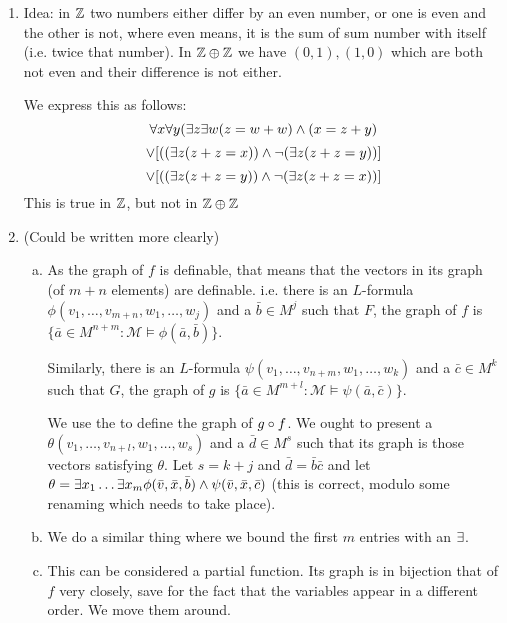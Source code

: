 \begin{enumerate}
\begin{enumerate}
	\item
	
	\end{enumerate}

\item Idea: in $\mathbb{Z}$ two numbers either differ by an even number, or one is even and the other is not, where even means, it is the sum of sum number with itself (i.e. twice that number). In $\mathbb{Z} \oplus \mathbb{Z}$ we have $(0, 1), (1, 0)$ which are both not even and their difference is not either. 

We express this as follows: \[\forall x\forall y (\exists z \exists w (z = w + w) \land (x = z + y)\]\[ \lor [((\exists z (z + z = x)) \land \neg (\exists z (z + z = y))]\]\[ \lor [((\exists z (z + z = y)) \land \neg (\exists z (z + z = x))]\] This is true in $\mathbb{Z}$, but not in $\mathbb{Z} \oplus \mathbb{Z}$

\item (Could be written more clearly)
	\begin{enumerate}[a)]
	\item As the graph of $f$ is definable, that means that the vectors in its graph (of $m + n$ elements) are definable. i.e. there is an $L$-formula $\phi(v_1, \ldots, v_{m+n}, w_1, \ldots, w_j)$ and a $\bar{b} \in M^j$ such that $F$, the graph of $f$ is $\{\bar{a} \in M^{n+m} : \mathcal{M} \models \phi(\bar{a}, \bar{b})\}$. 
	
	Similarly, there is an $L$-formula $\psi(v_1, \ldots, v_{n+m}, w_1, \ldots, w_k)$ and a $\bar{c} \in M^k$ such that $G$, the graph of $g$ is $\{\bar{a} \in M^{m+l} : \mathcal{M} \models \psi(\bar{a}, \bar{c})\}$.
	
	We use the to define the graph of $g \circ f$. We ought to present a $\theta(v_1, \ldots, v_{n+l}, w_1, \ldots, w_s)$ and a $\bar{d} \in M^s$ such that its graph is those vectors satisfying $\theta$. Let $s = k + j$ and $\bar{d} = \bar{b}\bar{c}$ and let $\theta = \exists x_1 \ldots \exists x_m \phi(\bar{v}, \bar{x}, \bar{b}) \land \psi(\bar{v}, \bar{x}, \bar{c})$ (this is correct, modulo some renaming which needs to take place). 
	
	\item We do a similar thing where we bound the first $m$ entries with an $\exists$. 
	
	\item This can be considered a partial function. Its graph is in bijection that of $f$ very closely, save for the fact that the variables appear in a different order. We move them around. 
	
	\end{enumerate}


\end{enumerate}
